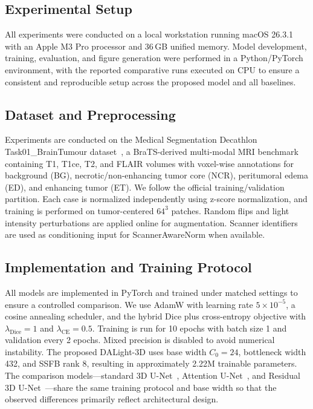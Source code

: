 \documentclass[conference]{IEEEtran}
\begin{document}
\subsection{Experimental Setup}
\label{sec:experimental_setup}

All experiments were conducted on a local workstation running macOS 26.3.1 with an Apple M3 Pro processor and 36\,GB unified memory. Model development, training, evaluation, and figure generation were performed in a Python/PyTorch environment, with the reported comparative runs executed on CPU to ensure a consistent and reproducible setup across the proposed model and all baselines.

\subsection{Dataset and Preprocessing}
\label{sec:dataset}

Experiments are conducted on the Medical Segmentation Decathlon Task01\_BrainTumour dataset~\cite{simpson2019msd}, a BraTS-derived multi-modal MRI benchmark containing T1, T1ce, T2, and FLAIR volumes with voxel-wise annotations for background (BG), necrotic/non-enhancing tumor core (NCR), peritumoral edema (ED), and enhancing tumor (ET). We follow the official training/validation partition. Each case is normalized independently using z-score normalization, and training is performed on tumor-centered $64^3$ patches. Random flips and light intensity perturbations are applied online for augmentation. Scanner identifiers are used as conditioning input for ScannerAwareNorm when available.

\subsection{Implementation and Training Protocol}
\label{sec:implementation}

All models are implemented in PyTorch and trained under matched settings to ensure a controlled comparison. We use AdamW with learning rate $5\times10^{-5}$, a cosine annealing scheduler, and the hybrid Dice plus cross-entropy objective with $\lambda_{\mathrm{Dice}}=1$ and $\lambda_{\mathrm{CE}}=0.5$. Training is run for 10 epochs with batch size 1 and validation every 2 epochs. Mixed precision is disabled to avoid numerical instability. The proposed DALight-3D uses base width $C_0=24$, bottleneck width 432, and SSFB rank 8, resulting in approximately 2.22M trainable parameters. The comparison models---standard 3D U-Net~\cite{cicek20163dunet}, Attention U-Net~\cite{oktay2018attentionunet}, and Residual 3D U-Net~\cite{he2016resnet}---share the same training protocol and base width so that the observed differences primarily reflect architectural design.
\end{document}
